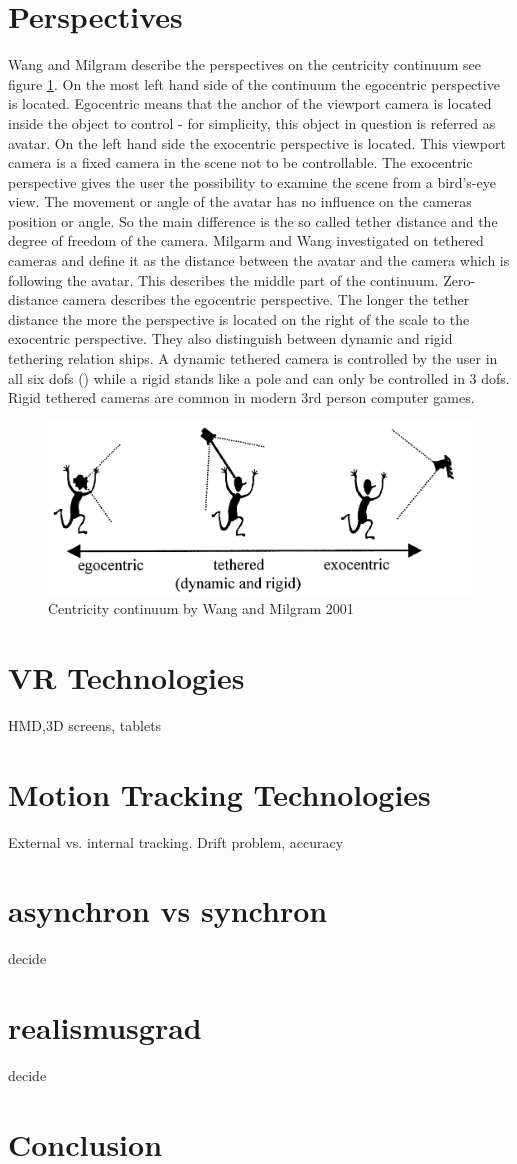 \section{Perspectives}
\markAoneIndependent
Wang and Milgram \cite{Wang2001} describe the perspectives on the centricity continuum see figure \ref{fig:ego-exo-cont}. On the most left hand side of the continuum the egocentric perspective is located. Egocentric means that the anchor of the viewport camera is located inside the object to control - for simplicity, this object in question is referred as avatar. On the left hand side the exocentric perspective is located. This viewport camera is a fixed camera in the scene not to be controllable. The exocentric perspective gives the user the possibility to examine the scene from a bird's-eye view. The movement or angle of the avatar has no influence on the cameras position or angle. So the main difference is the so called tether distance and the degree of freedom of the camera. Milgarm and Wang investigated on tethered cameras and define it as the distance between the avatar and the camera which is following the avatar. This describes the middle part of the continuum. Zero-distance camera describes the egocentric perspective. The longer the tether distance the more the perspective is located on the right of the scale to the exocentric perspective. They also distinguish between dynamic and rigid tethering relation ships. A dynamic tethered camera is controlled by the user in all six dofs (\todo) while a rigid stands like a pole and can only be controlled in 3 dofs. Rigid tethered cameras are common in modern 3rd person computer games.
\begin{figure}
	\centering
		\includegraphics[width=1.0\textwidth]{img/ego_exo_continuum_bigger.PNG}
	\caption{Centricity continuum by Wang and Milgram 2001 \cite{Wang2001}}
	\label{fig:ego-exo-cont}
\end{figure}
\markAsixPerspective
\section{VR Technologies}
HMD,3D screens, tablets

\section{Motion Tracking Technologies}
External vs. internal tracking. Drift problem, accuracy

\section{asynchron vs synchron}
decide \markAtenSync
\section{realismusgrad}
decide \markAonefourRealism
\section{Conclusion}